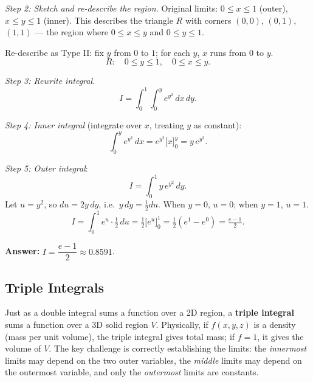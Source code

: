 \documentclass[12pt,a4paper]{article}
\begin{document}
\textit{Step 2: Sketch and re-describe the region.}
Original limits: \(0 \le x \le 1\) (outer), \(x \le y \le 1\) (inner). This describes the triangle \(R\) with corners \((0,0)\), \((0,1)\), \((1,1)\) --- the region where \(0 \le x \le y\) and \(0 \le y \le 1\).

Re-describe as Type II: fix \(y\) from \(0\) to \(1\); for each \(y\), \(x\) runs from \(0\) to \(y\).
\[
  R:\quad 0 \le y \le 1,\quad 0 \le x \le y.
\]

\textit{Step 3: Rewrite integral.}
\[
  I = \int_0^1 \int_0^y e^{y^2}\,dx\,dy.
\]

\textit{Step 4: Inner integral} (integrate over \(x\), treating \(y\) as constant):
\[
  \int_0^y e^{y^2}\,dx = e^{y^2}\bigl[x\bigr]_0^y = y\,e^{y^2}.
\]

\textit{Step 5: Outer integral}:
\[
  I = \int_0^1 y\,e^{y^2}\,dy.
\]
Let \(u = y^2\), so \(du = 2y\,dy\), i.e.\ \(y\,dy = \tfrac{1}{2}du\). When \(y=0\), \(u=0\); when \(y=1\), \(u=1\).
\[
  I = \int_0^1 e^u \cdot \tfrac{1}{2}\,du = \tfrac{1}{2}\bigl[e^u\bigr]_0^1 = \tfrac{1}{2}(e^1 - e^0) = \tfrac{e-1}{2}.
\]

\textbf{Answer:} \(\displaystyle I = \dfrac{e-1}{2} \approx 0.8591\).

\subsection{Triple Integrals}

Just as a double integral sums a function over a 2D region, a \textbf{triple integral} sums a function over a 3D solid region \(V\). Physically, if \(f(x,y,z)\) is a density (mass per unit volume), the triple integral gives total mass; if \(f=1\), it gives the volume of \(V\). The key challenge is correctly establishing the limits: the \emph{innermost} limits may depend on the two outer variables, the \emph{middle} limits may depend on the outermost variable, and only the \emph{outermost} limits are constants.
\end{document}
